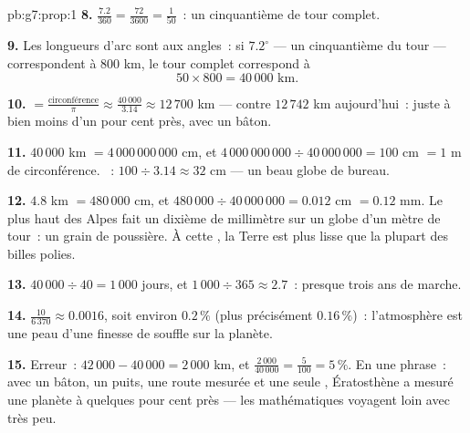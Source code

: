 \begin{solution}{pb:g7:prop:1}
\textbf{8.} $\frac{7.2}{360} = \frac{72}{3600} = \frac{1}{50}$~: un
cinquantième de tour complet.

\textbf{9.} Les longueurs d'arc sont  aux angles~:
si $7.2^\circ$ --- un cinquantième du tour --- correspondent à
$800$ km, le tour complet correspond à
\[
50 \times 800 = 40\,000 \text{ km}.
\]

\textbf{10.}  $= \frac{\text{circonférence}}{\pi}
\approx \frac{40\,000}{3.14} \approx 12\,700$ km --- contre
$12\,742$ km aujourd'hui~: juste à bien moins d'un pour cent près,
avec un bâton.

\textbf{11.} $40\,000$ km $= 4\,000\,000\,000$ cm, et
$4\,000\,000\,000 \div 40\,000\,000 = 100$ cm $= 1$ m de
circonférence. ~: $100 \div 3.14 \approx 32$ cm --- un beau
globe de bureau.

\textbf{12.} $4.8$ km $= 480\,000$ cm, et
$480\,000 \div 40\,000\,000 = 0.012$ cm $= 0.12$ mm. Le plus haut
 des Alpes fait un dixième de millimètre sur un globe d'un
mètre de tour~: un grain de poussière. À cette , la Terre est
plus lisse que la plupart des billes polies.

\textbf{13.} $40\,000 \div 40 = 1\,000$ jours, et
$1\,000 \div 365 \approx 2.7$~: presque trois ans de marche.

\textbf{14.} $\frac{10}{6\,370} \approx 0.0016$, soit environ
$0.2\,\%$ (plus précisément $0.16\,\%$)~: l'atmosphère est une peau
d'une finesse de souffle sur la planète.

\textbf{15.} Erreur~: $42\,000 - 40\,000 = 2\,000$ km, et
$\frac{2\,000}{40\,000} = \frac{5}{100} = 5\,\%$. En une phrase~:
avec un bâton, un puits, une route mesurée et une seule
, Ératosthène a mesuré une planète à quelques pour
cent près --- les mathématiques voyagent loin avec très peu.
\end{solution}

